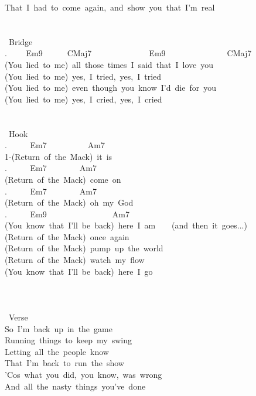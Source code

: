 {That\ I\ had\ to\ come\ again,\ and\ show\ you\ that\ I'm\ real\\
\\
\\
\lbrack\ Bridge\rbrack\\
. \ \ \ \ Em9\ \ \ \ \ \ CMaj7\ \ \ \ \ \ \ \ \ \ \ \ \ \ Em9\ \ \ \ \ \ \ \ \ \ \ \ \ \ \ CMaj7\\
(You\ lied\ to\ me)\ all\ those\ times\ I\ said\ that\ I\ love\ you\\
(You\ lied\ to\ me)\ yes,\ I\ tried,\ yes,\ I\ tried\\
(You\ lied\ to\ me)\ even\ though\ you\ know\ I'd\ die\ for\ you\\
(You\ lied\ to\ me)\ yes,\ I\ cried,\ yes,\ I\ cried\\
\\
\\
\lbrack\ Hook\rbrack\\
. \ \ \ \ \ Em7\ \ \ \ \ \ \ \ \ \ Am7\\
1-(Return\ of\ the\ Mack)\ it\ is\\
. \ \ \ \ \ Em7\ \ \ \ \ \ \ \ Am7\ \\
(Return\ of\ the\ Mack)\ come\ on\\
. \ \ \ \ \ Em7\ \ \ \ \ \ \ \ Am7\\
(Return\ of\ the\ Mack)\ oh\ my\ God\\
. \ \ \ \ \ Em9\ \ \ \ \ \ \ \ \ \ \ \ \ \ \ \ Am7\\
(You\ know\ that\ I'll\ be\ back)\ here\ I\ am\ \ \ \ (and\ then\ it\ goes...)\\
(Return\ of\ the\ Mack)\ once\ again\\
(Return\ of\ the\ Mack)\ pump\ up\ the\ world\\
(Return\ of\ the\ Mack)\ watch\ my\ flow\\
(You\ know\ that\ I'll\ be\ back)\ here\ I\ go\\
\\
\\
\\
\lbrack\ Verse\rbrack\\
So\ I'm\ back\ up\ in\ the\ game\\
Running\ things\ to\ keep\ my\ swing\\
Letting\ all\ the\ people\ know\\
That\ I'm\ back\ to\ run\ the\ show\\
'Cos\ what\ you\ did,\ you\ know,\ was\ wrong\\
And\ all\ the\ nasty\ things\ you've\ done\\
}
